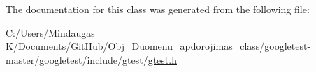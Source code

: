 The documentation for this class was generated from the following file\+:\begin{DoxyCompactItemize}
\item 
C\+:/\+Users/\+Mindaugas K/\+Documents/\+Git\+Hub/\+Obj\+\_\+\+Duomenu\+\_\+apdorojimas\+\_\+class/googletest-\/master/googletest/include/gtest/\mbox{\hyperlink{googletest-master_2googletest_2include_2gtest_2gtest_8h}{gtest.\+h}}\end{DoxyCompactItemize}
